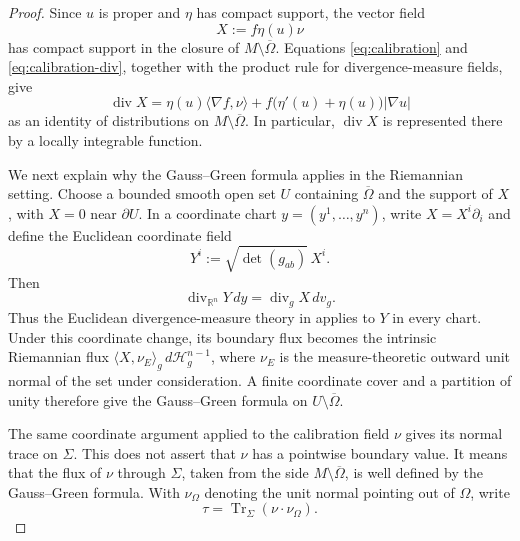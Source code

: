 \documentclass[10pt,a4paper]{amsart}
\numberwithin{equation}{section}
\newcommand{\calH}{\mathcal H}
\newcommand{\diver}{\operatorname{div}}
\begin{document}
\begin{proof}
Since $u$ is proper and $\eta$ has compact support, the vector field
\begin{equation*}
    X:=f\eta(u)\nu
\end{equation*}
has compact support in the closure of $M\setminus\overline\Omega$.  Equations \eqref{eq:calibration} and \eqref{eq:calibration-div}, together with the product rule for divergence-measure fields, give
\begin{equation}
    \diver X
    =\eta(u)\langle\nabla f,\nu\rangle
     +f\bigl(\eta'(u)+\eta(u)\bigr)|\nabla u|
     \label{equ-divX}
\end{equation}
as an identity of distributions on $M\setminus\overline\Omega$.  In particular, $\diver X$ is represented there by a locally integrable function.

We next explain why the Gauss--Green formula applies in the Riemannian
setting. Choose a bounded smooth open set $U$ containing $\overline\Omega$ and the support of $X$, with $X=0$ near $\partial U$.  In a coordinate chart $y=(y^1,\ldots,y^n)$, write $X=X^i\partial_i$ and define the Euclidean coordinate field
\begin{equation*}
    Y^i:=\sqrt{\det(g_{ab})}\,X^i.
\end{equation*}
Then
\begin{equation*}
    \diver_{\mathbb R^n}Y\,dy
    =\diver_gX\,dv_g.
\end{equation*}
Thus the Euclidean divergence-measure theory in
\cite[Theorems~2.2 and~3.1]{ChenFrid1999} applies to $Y$ in every chart.  Under this coordinate change, its boundary flux becomes the intrinsic Riemannian flux $\langle X,\nu_E\rangle_g\,d\calH_g^{n-1}$, where $\nu_E$ is the measure-theoretic outward unit normal of the set under consideration.  A finite coordinate cover and a partition of unity therefore give the Gauss--Green formula on $U\setminus\overline\Omega$.

The same coordinate argument applied to the calibration field $\nu$ gives its normal trace on $\Sigma$.  This does not assert that $\nu$ has a pointwise boundary value. It means that the flux of $\nu$ through $\Sigma$, taken from the side $M\setminus\overline\Omega$, is well defined by the Gauss--Green formula.  With $\nu_{\Omega}$ denoting the unit normal pointing out of $\Omega$, write
\begin{equation*}
    \tau=\operatorname{Tr}_\Sigma(\nu\cdot\nu_\Omega).
\end{equation*}


\end{proof}
\end{document}
